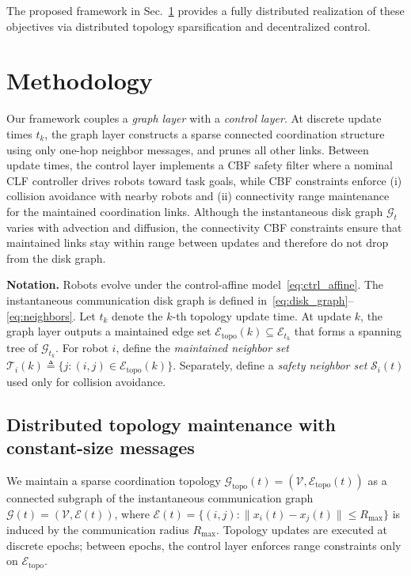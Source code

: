 \documentclass[conference]{IEEEconf}
\theoremstyle{plain}
\begin{document}
The proposed framework in Sec.~\ref{sec:method} provides a fully distributed realization of these objectives via distributed topology sparsification and decentralized control.

\section{Methodology}
\label{sec:method}

Our framework couples a \emph{graph layer} with a \emph{control layer}.
At discrete update times $t_k$, the graph layer constructs a sparse connected coordination structure using only one-hop neighbor messages, and prunes all other links.
Between update times, the control layer implements a CBF safety filter where a nominal CLF controller drives robots toward task goals, while CBF constraints enforce (i) collision avoidance with nearby robots and (ii) connectivity range maintenance for the maintained coordination links.
Although the instantaneous disk graph $\mathcal{G}_t$ varies with advection and diffusion, the connectivity CBF constraints ensure that maintained links stay within range between updates and therefore do not drop from the disk graph.

\vspace{0.25em}
\noindent
\textbf{Notation.}
Robots evolve under the control-affine model~\eqref{eq:ctrl_affine}.
The instantaneous communication disk graph is defined in~\eqref{eq:disk_graph}--\eqref{eq:neighbors}.
Let $t_k$ denote the $k$-th topology update time.
At update $k$, the graph layer outputs a maintained edge set $\mathcal{E}_{\mathrm{topo}}(k)\subseteq \mathcal{E}_{t_k}$ that forms a spanning tree of $\mathcal{G}_{t_k}$.
For robot $i$, define the \emph{maintained neighbor set} $\mathcal{T}_i(k)\triangleq \{j:(i,j)\in \mathcal{E}_{\mathrm{topo}}(k)\}$.
Separately, define a \emph{safety neighbor set} $\mathcal{S}_i(t)$ used only for collision avoidance.

\subsection{Distributed topology maintenance with constant-size messages}
\label{sec:topology}

We maintain a sparse coordination topology $\mathcal{G}_{\mathrm{topo}}(t)=(\mathcal{V},\mathcal{E}_{\mathrm{topo}}(t))$ as a connected subgraph of the instantaneous communication graph $\mathcal{G}(t)=(\mathcal{V},\mathcal{E}(t))$, where $\mathcal{E}(t)=\{(i,j):\|x_i(t)-x_j(t)\|\le R_{\max}\}$ is induced by the communication radius $R_{\max}$. Topology updates are executed at discrete epochs; between epochs, the control layer enforces range constraints only on $\mathcal{E}_{\mathrm{topo}}$.
\end{document}
